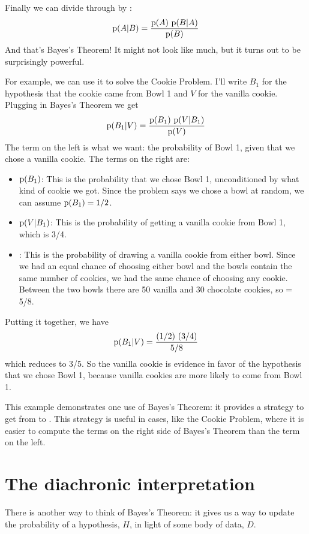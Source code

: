 \documentclass[12pt]{book}
\begin{document}
Finally we can divide through by :
%
\[ \mathrm{p}(A|B) = \frac{\mathrm{p}(A)~\mathrm{p}(B|A)}{\mathrm{p}(B)} \]
%
And that's Bayes's Theorem!  It might not look like much, but
it turns out to be surprisingly powerful.

For example, we can use it to solve the Cookie Problem.  I'll write
$B_1$ for the hypothesis that the cookie came from Bowl 1
and $V$ for the vanilla cookie.  Plugging in Bayes's Theorem
we get
%
\[ \mathrm{p}(B_1|V) = \frac{\mathrm{p}(B_1)~\mathrm{p}(V|B_1)}{\mathrm{p}(V)} \]
%
The term on the left is what we want: the probability of Bowl 1, given
that we chose a vanilla cookie.  The terms on the right are:

\begin{itemize}

\item $\mathrm{p}(B_1)$: This is the probability that we chose Bowl 1, unconditioned
by what kind of cookie we got.  Since the problem says we chose a
bowl at random, we can assume $\mathrm{p}(B_1) = 1/2$.

\item $\mathrm{p}(V|B_1)$: This is the probability of getting a vanilla cookie
from Bowl 1, which is 3/4.

\item {}: This is the probability of drawing a vanilla cookie from
either bowl.  Since we had an equal chance of choosing either bowl
and the bowls contain the same number of cookies, we had the same
chance of choosing any cookie.  Between the two bowls there are
50 vanilla and 30
chocolate cookies, so  = 5/8.

\end{itemize}

Putting it together, we have 
%
\[ \mathrm{p}(B_1|V) = \frac{(1/2)~(3/4)}{5/8} \]
%
which reduces to 3/5.  So the vanilla cookie is evidence in favor of
the hypothesis that we chose Bowl 1, because vanilla cookies are more
likely to come from Bowl 1.

This example demonstrates one use of Bayes's Theorem: it provides
a strategy to get from  to .  This strategy is useful
in cases, like the Cookie Problem, where it is easier to compute
the terms on the right side of Bayes's Theorem than the term on the
left.


\section{The diachronic interpretation}

There is another way to think of Bayes's Theorem: it gives us a
way to update the probability of a hypothesis, $H$, in light of
some body of data, $D$.
\end{document}
